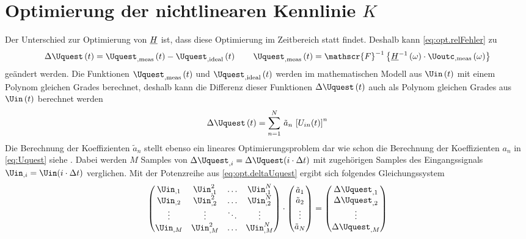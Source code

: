 \documentclass[../Report.tex]{subfiles}
\begin{document}
\section{Optimierung der nichtlinearen Kennlinie $K$}
\label{sec:opt.K}
Der Unterschied zur Optimierung von $\underline{H}$ ist, dass diese Optimierung im Zeitbereich statt findet. Deshalb kann \eqref{eq:opt.relFehler} zu
\begin{align}
	\label{eq:opt.deltaUquest}
	\Delta \Uquest \oft = \Uquest_{, \mathrm{meas}} \oft - \Uquest_{, \mathrm{ideal}} \oft
	\qquad
	\Uquest_{, \mathrm{meas}} \oft = \mathscr{F}^{-1} \left\{ \Hcompl^{-1} \ofomega \cdot \Uoutc_{, \mathrm{meas}} \ofomega \right\}
\end{align}
geändert werden. Die Funktionen $\Uquest_{, \mathrm{meas}} \oft$ und $\Uquest_{, \mathrm{ideal}} \oft$ werden im mathematischen Modell aus $\Uin \oft$ mit einem Polynom gleichen Grades berechnet, deshalb kann die Differenz dieser Funktionen $\Delta \Uquest \oft$ auch als Polynom gleichen Grades aus $\Uin \oft$ berechnet werden
\begin{align}
	\Delta \Uquest \oft = \sum_{n=1}^N \, \tilde{a}_n \, \left[ U_{in}(t) \right]^n	
\end{align}
Die Berechnung der Koeffizienten $\tilde{a}_n$ stellt ebenso ein lineares Optimierungsproblem dar wie schon die Berechnung der Koeffizienten $a_n$ in \eqref{eq:Uquest} siehe \cite{harzheim}. Dabei werden $M$ Samples von ${\Delta \Uquest_{,i} = \Delta \Uquest (i \cdot \Delta t)}$ mit zugehörigen Samples des Eingangssignals ${\Uin_{,i} = \Uin (i \cdot \Delta t)}$ verglichen. Mit der Potenzreihe aus  \eqref{eq:opt.deltaUquest} ergibt sich folgendes Gleichungssystem
\begin{align}
	\left( 
	\begin{matrix}
	 	\Uin_{,1} & \Uin_{,1}^2 & \dots & \Uin_{,1}^N \\
		\Uin_{,2} & \Uin_{,2}^2 & \dots & \Uin_{,2}^N \\
		\vdots & \vdots & \ddots & \vdots \\
		\Uin_{,M} & \Uin_{,M}^2 & \dots & \Uin_{,M}^N \\
	\end{matrix}
	\right)
	\cdot
	\left(
	\begin{matrix}
		\tilde{a}_1 \\
		\tilde{a}_2 \\
		\vdots \\
		\tilde{a}_N \\	 
	\end{matrix}
	\right) = \left( 
	\begin{matrix}
		\Delta \Uquest_{,1} \\
		\Delta \Uquest_{,2} \\
		\vdots \\
		\Delta \Uquest_{,M} \\	 
	\end{matrix}
	\right)
	\label{eq:Uquest.Gleichungssystem}
\end{align}
\end{document}
